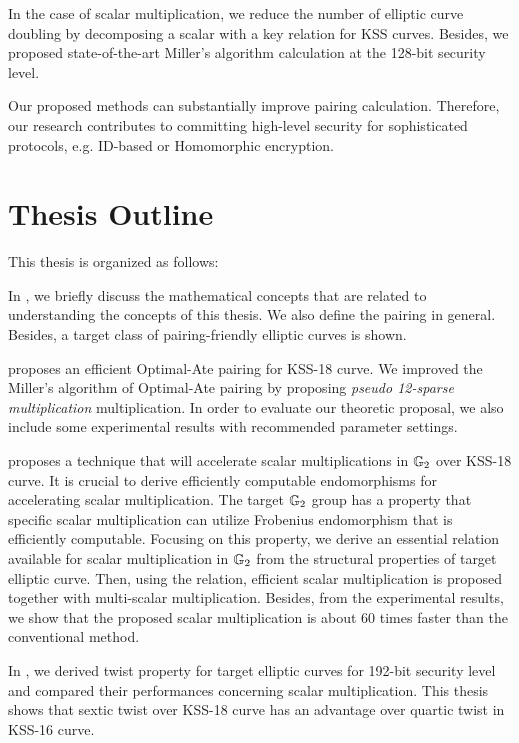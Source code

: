 In the case of scalar multiplication, we reduce the number of elliptic curve doubling by decomposing a scalar with a key relation for KSS curves.
Besides, we proposed state-of-the-art Miller's algorithm calculation at the 128-bit security level.

Our proposed methods can substantially improve pairing calculation.
Therefore, our research contributes to committing high-level security for sophisticated protocols, e.g. ID-based or Homomorphic encryption.

\section{Thesis Outline}
\label{ch1_sec_outline}
This thesis is organized as follows: 

In , we briefly discuss the mathematical concepts that are related to understanding the concepts of this thesis.
We also define the pairing in general. 
Besides, a target class of pairing-friendly elliptic curves is shown.

 proposes an efficient Optimal-Ate pairing for KSS-18 curve. 
We improved the Miller's algorithm of Optimal-Ate pairing by proposing \textit{pseudo 12-sparse multiplication} multiplication.
In order to evaluate our theoretic proposal, we also include some experimental results with recommended parameter settings.

 proposes a technique that will accelerate scalar multiplications in ${\mathbb{G}}_{2}$ over KSS-18 curve. 
It is crucial to derive efficiently computable endomorphisms for accelerating scalar multiplication.
The target ${\mathbb{G}}_{2}$ group has a property that specific scalar multiplication can utilize  Frobenius endomorphism that is efficiently computable.
Focusing on this property, we derive an essential relation available for scalar multiplication in ${\mathbb{G}}_{2}$ from the structural properties of target elliptic curve.
Then, using the relation, efficient scalar multiplication is proposed together with multi-scalar multiplication.
Besides, from the experimental results, we show that the proposed scalar multiplication is about 60 times faster than the conventional method.  

In , we derived twist property for target elliptic curves for 192-bit security level and compared their performances concerning scalar multiplication.
This thesis shows that sextic twist over KSS-18 curve has an advantage over quartic twist in KSS-16 curve.


